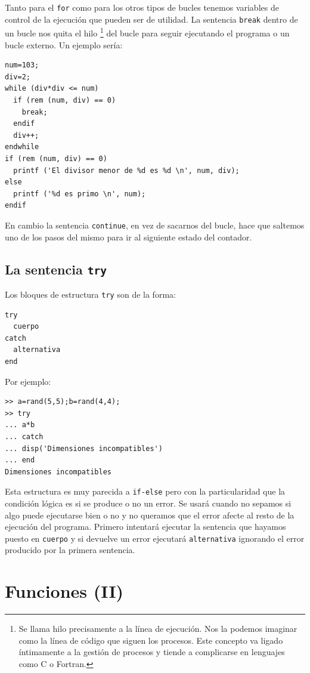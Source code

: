 Tanto para el \texttt{for} como para los otros tipos de bucles tenemos
variables de control de la ejecución que pueden ser de utilidad. La
sentencia \texttt{break} dentro de un bucle nos quita el hilo%
\footnote{Se llama hilo precisamente a la línea de ejecución. Nos la
  podemos imaginar como la línea de código que siguen los procesos.
  Este concepto va ligado íntimamente a la gestión de procesos y
  tiende a complicarse en lenguajes como C o Fortran.%
} del bucle para seguir ejecutando el programa o un bucle externo.  Un
ejemplo sería:

\begin{lstlisting}
num=103;   
div=2;   
while (div*div <= num)   
  if (rem (num, div) == 0)   
    break;   
  endif   
  div++;   
endwhile   
if (rem (num, div) == 0)   
  printf ('El divisor menor de %d es %d \n', num, div);   
else   
  printf ('%d es primo \n', num);   
endif
\end{lstlisting}
En cambio la sentencia \texttt{continue}, en vez de sacarnos del
bucle, hace que saltemos uno de los pasos del mismo para ir al
siguiente estado del contador.


\subsection{La sentencia \texttt{try}}

Los bloques de estructura \texttt{try} son de la forma:

\begin{lstlisting}
try
  cuerpo
catch 
  alternativa
end
\end{lstlisting}

Por ejemplo:
\begin{lstlisting}
>> a=rand(5,5);b=rand(4,4);
>> try
... a*b
... catch
... disp('Dimensiones incompatibles')
... end
Dimensiones incompatibles
\end{lstlisting}

Esta estructura es muy parecida a \texttt{if-else} pero con la
particularidad que la condición lógica es si se produce o no un error.
Se usará cuando no sepamos si algo puede ejecutarse bien o no y no
queramos que el error afecte al resto de la ejecución del programa.
Primero intentará ejecutar la sentencia que hayamos puesto en
\texttt{cuerpo} y si devuelve un error ejecutará \texttt{alternativa}
ignorando el error producido por la primera sentencia.


\section{Funciones (II)}

